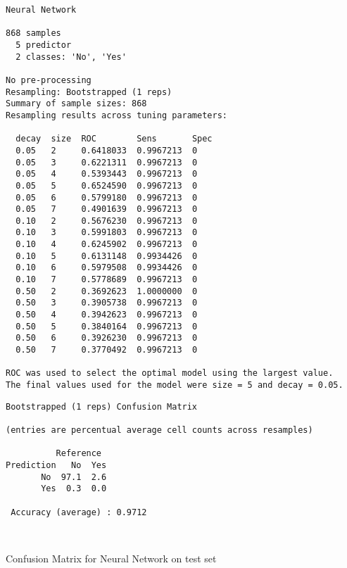 \documentclass[11pt]{article}
\begin{document}
    \begin{Verbatim}[commandchars=\\\{\}]
Neural Network 

868 samples
  5 predictor
  2 classes: 'No', 'Yes' 

No pre-processing
Resampling: Bootstrapped (1 reps) 
Summary of sample sizes: 868 
Resampling results across tuning parameters:

  decay  size  ROC        Sens       Spec
  0.05   2     0.6418033  0.9967213  0   
  0.05   3     0.6221311  0.9967213  0   
  0.05   4     0.5393443  0.9967213  0   
  0.05   5     0.6524590  0.9967213  0   
  0.05   6     0.5799180  0.9967213  0   
  0.05   7     0.4901639  0.9967213  0   
  0.10   2     0.5676230  0.9967213  0   
  0.10   3     0.5991803  0.9967213  0   
  0.10   4     0.6245902  0.9967213  0   
  0.10   5     0.6131148  0.9934426  0   
  0.10   6     0.5979508  0.9934426  0   
  0.10   7     0.5778689  0.9967213  0   
  0.50   2     0.3692623  1.0000000  0   
  0.50   3     0.3905738  0.9967213  0   
  0.50   4     0.3942623  0.9967213  0   
  0.50   5     0.3840164  0.9967213  0   
  0.50   6     0.3926230  0.9967213  0   
  0.50   7     0.3770492  0.9967213  0   

ROC was used to select the optimal model using the largest value.
The final values used for the model were size = 5 and decay = 0.05.

    \end{Verbatim}

    
    \begin{verbatim}
Bootstrapped (1 reps) Confusion Matrix 

(entries are percentual average cell counts across resamples)
 
          Reference
Prediction   No  Yes
       No  97.1  2.6
       Yes  0.3  0.0
                            
 Accuracy (average) : 0.9712

    \end{verbatim}

    
    
    
    \begin{center}
    \end{center}
    { \hspace*{\fill} \\}
    
    Confusion Matrix for Neural Network on test set
\end{document}
